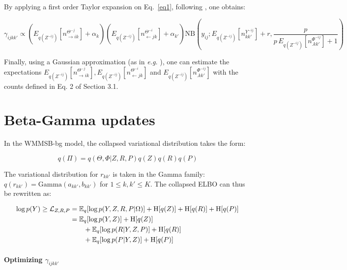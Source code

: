 By applying a first order Taylor expansion on Eq.~\eqref{eq1}, following \cite{teh2006collapsed}, one obtains:

\begin{equation}
\gamma_{ijkk'} \propto (E_{q(Z^{-ij})}[n_{\rightarrow ik}^{\Theta^{-j}}] + \alpha_k) (E_{q(Z^{-ij})}[n_{\leftarrow jk}^{\Theta^{-i}}] + \alpha_{k'}) \mathrm{NB}\left(y_{ij}; E_{q(Z^{-ij})}[n^{Y^{-ij}}_{kk'}] + r, \frac{p}{p\,E_{q(Z^{-ij})}[n^{\Phi^{-ij}}_{\bm{.}kk'}] + 1} \right) \nonumber
\end{equation}

Finally, using a Gaussian approximation (as in \textit{e.g.} \cite{asuncion2009smoothing}), one can estimate the expectations $E_{q(Z^{-ij})}[n_{\rightarrow ik}^{\Theta^{-j}}], E_{q(Z^{-ij})}[n_{\leftarrow jk}^{\Theta^{-i}}]$ and  $E_{q(Z^{-ij})}[n^{\Phi^{-ij}}_{\bm{.}kk'}]$ with the counts defined in Eq. 2 of Section 3.1.

\section{Beta-Gamma updates}

In the WMMSB-bg model, the collapsed variational distribution takes the form:

\begin{equation*}
q(\Pi) = q(\Theta, \Phi|Z, R, P) q(Z)q(R)q(P)
\end{equation*}

The variational distribution for $r_{kk'}$ is taken in the Gamma family:  $q(r_{kk'}) = \textrm{Gamma}(a_{kk'},b_{kk'})$ for $1\leq k,k' \leq K$. The collapsed ELBO can thus be rewritten as:

\begin{align*}
\log p(Y) \geq \mathcal{L}_{Z,R,P} &= \mathbb{E}_{q}[\log p(Y, Z, R, P|\Omega)] + \textrm{H}[q(Z)] + \textrm{H}[q(R)] + \textrm{H}[q(P)] \\
                        &= \mathbb{E}_{q}[\log p(Y, Z)] + \textrm{H}[q(Z)] \\
                        &\qquad + \mathbb{E}_{q}[\log p(R|Y,Z,P)] + \textrm{H}[q(R)] \\
                        &\qquad +\mathbb{E}_{q}[\log p(P|Y,Z)] + \textrm{H}[q(P)] 
\end{align*}

\paragraph{Optimizing $\gamma_{ijkk'}$}

